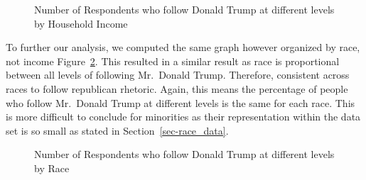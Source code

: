 \documentclass[
  letterpaper,
  DIV=11,
  numbers=noendperiod]{scrartcl}
\begin{document}
\begin{figure}


\caption{\label{fig-figure3}Number of Respondents who follow Donald
Trump at different levels by Household Income}

\end{figure}%

To further our analysis, we computed the same graph however organized by
race, not income Figure~\ref{fig-figure4}. This resulted in a similar
result as race is proportional between all levels of following
Mr.~Donald Trump. Therefore, consistent across races to follow
republican rhetoric. Again, this means the percentage of people who
follow Mr.~Donald Trump at different levels is the same for each race.
This is more difficult to conclude for minorities as their
representation within the data set is so small as stated in
Section~\ref{sec-race_data}.

\begin{figure}


\caption{\label{fig-figure4}Number of Respondents who follow Donald
Trump at different levels by Race}

\end{figure}%
\end{document}
